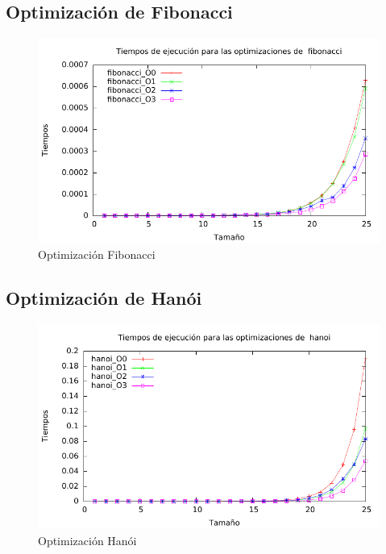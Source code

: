 \documentclass[a4paper, 11pt]{article}
\begin{document}
\subsection{Optimización de Fibonacci}

\begin{figure}[H]\includegraphics[width=13cm]{img/fibonacci_optim_g.pdf} \centering
	\caption{Optimización Fibonacci}\end{figure}

\subsection{Optimización de Hanói}

\begin{figure}[H]\includegraphics[width=13cm]{img/hanoi_optim_g.pdf} \centering
	\caption{Optimización Hanói}\end{figure}
\end{document}
